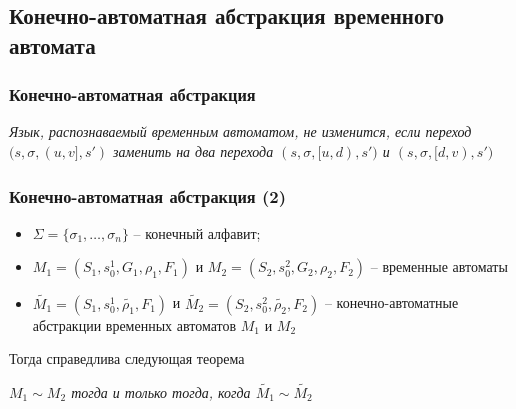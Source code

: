 \documentclass{beamer}
\begin{document}
\subsection{Конечно-автоматная абстракция временного автомата}

\begin{frame}
\frametitle{Конечно-автоматная абстракция}



\begin{theorem}
{\itshape
Язык, распознаваемый временным автоматом, не изменится, если переход $(s, \sigma, (u, v], s')$ заменить на два перехода $(s, \sigma, [u, d), s')$ и $(s, \sigma, [d, v), s')$
}
\end{theorem}

\end{frame}

\begin{frame}
\frametitle{Конечно-автоматная абстракция (2)}

\begin{itemize}
	\item $\Sigma = \{ \sigma_1, \dots, \sigma_n \}$ -- конечный алфавит;
	\item $M_1 = (S_1, s^1_0, G_1, \rho_1, F_1)$ и $M_2 = (S_2, s^2_0, G_2, \rho_2, F_2)$ -- временные автоматы
	\item $\widetilde{M_1} = (S_1, s^1_0, \widetilde{\rho_1}, F_1)$ и $\widetilde{M_2} = (S_2, s^2_0, \widetilde{\rho_2}, F_2)$ -- конечно-автоматные абстракции временных автоматов $M_1$ и $M_2$
\end{itemize}

Тогда справедлива следующая теорема
\begin{theorem}
{\itshape
$M_1 \sim M_2$ тогда и только тогда, когда $\widetilde{M_1} \sim \widetilde{M_2}$
}
\end{theorem}

\end{frame}
\end{document}
